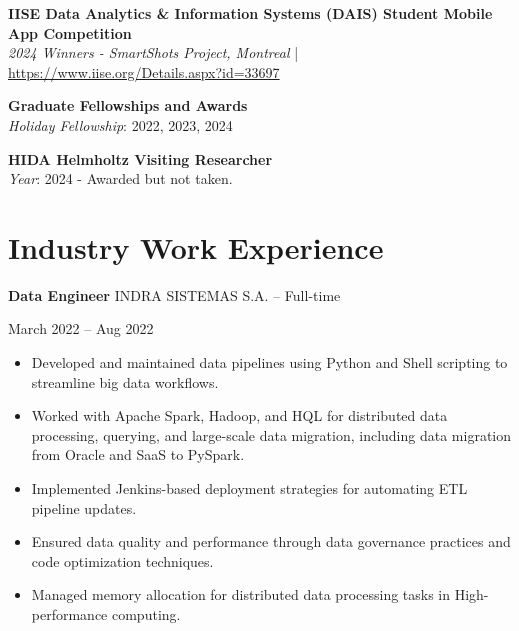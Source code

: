 \documentclass[10pt, letterpaper]{article}
\newenvironment{highlights}{
    \begin{itemize}[
        topsep=0.10 cm,
        parsep=0.10 cm,
        partopsep=0pt,
        itemsep=0pt,
        leftmargin=0 cm + 10pt
    ]
}{
    \end{itemize}
} %
\newenvironment{twocolentry}[2][]{
    \onecolentry
    \def\secondColumn{#2}
    \setcolumnwidth{\fill, 4.5 cm}
    \begin{paracol}{2}
}{
    \switchcolumn \raggedleft \secondColumn
    \end{paracol}
    \endonecolentry
} %
\begin{document}
     
    \noindent \textbf{IISE Data Analytics \& Information Systems (DAIS) Student Mobile App Competition} \\
    \textit{2024 Winners - SmartShots Project, Montreal} | \url{https://www.iise.org/Details.aspx?id=33697}\\
    
    
 
    \vspace{0.5em} %
    
    \noindent \textbf{Graduate Fellowships and Awards} \\
    \textit{Holiday Fellowship}: 2022, 2023, 2024 \\
    
    \vspace{0.5em} %
    
    \noindent \textbf{HIDA Helmholtz Visiting Researcher} \\
    \textit{Year}: 2024 - Awarded but not taken.




        
\section*{Industry Work Experience}
\small

\begin{twocolentry}{March 2022 – Aug 2022}
    \textbf{Data Engineer}  \textbar INDRA SISTEMAS S.A. – Full-time
\end{twocolentry}
\begin{highlights}
    \item Developed and maintained data pipelines using Python and Shell scripting to streamline big data workflows.
    \item Worked with Apache Spark, Hadoop, and HQL for distributed data processing, querying, and large-scale data migration, including data migration from Oracle and SaaS to PySpark.
    \item Implemented Jenkins-based deployment strategies for automating ETL pipeline updates.
    \item Ensured data quality and performance through data governance practices and code optimization techniques.
    \item Managed memory allocation for distributed data processing tasks in High-performance computing.
\end{highlights}
\vspace{0.3cm}
\end{document}
